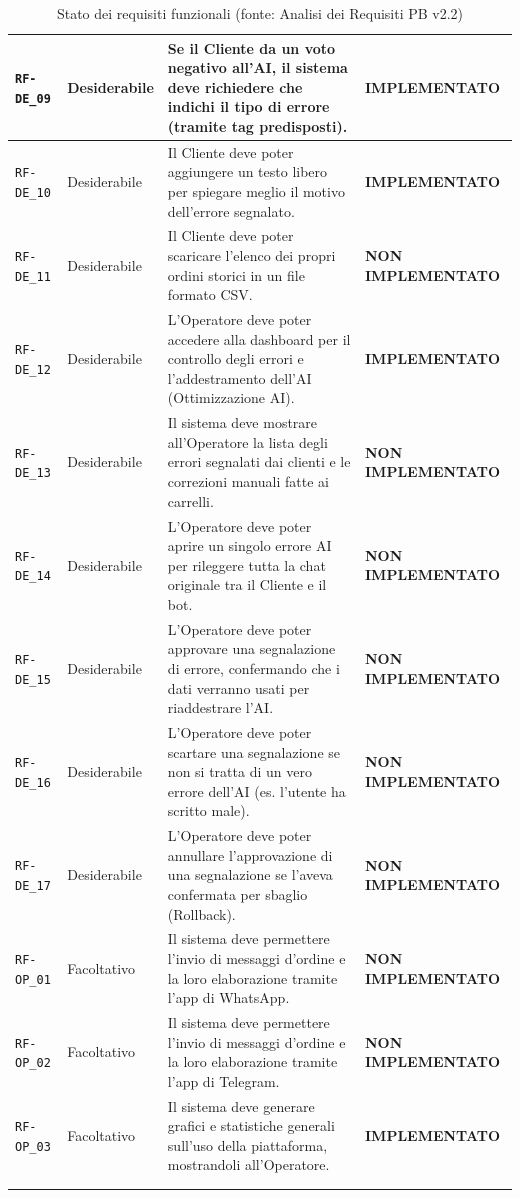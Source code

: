 \documentclass[a4paper, 11pt, oneside]{scrartcl}
\begin{document}
\begin{longtable}{|>{\raggedright\arraybackslash}p{}|>{\raggedright\arraybackslash}p{}|>{\raggedright\arraybackslash}p{}|>{\raggedright\arraybackslash}p{}|}
    \hline
    \texttt{RF-DE\_09} & Desiderabile & Se il Cliente da un voto negativo all'AI, il sistema deve richiedere che indichi il tipo di errore (tramite tag predisposti). & \textbf{IMPLEMENTATO} \\
    \hline
    \texttt{RF-DE\_10} & Desiderabile & Il Cliente deve poter aggiungere un testo libero per spiegare meglio il motivo dell'errore segnalato. & \textbf{IMPLEMENTATO} \\
    \hline
    \texttt{RF-DE\_11} & Desiderabile & Il Cliente deve poter scaricare l'elenco dei propri ordini storici in un file formato CSV. & \textbf{NON IMPLEMENTATO} \\
    \hline
    \texttt{RF-DE\_12} & Desiderabile & L'Operatore deve poter accedere alla dashboard per il controllo degli errori e l'addestramento dell'AI (Ottimizzazione AI). & \textbf{IMPLEMENTATO} \\
    \hline
    \texttt{RF-DE\_13} & Desiderabile & Il sistema deve mostrare all'Operatore la lista degli errori segnalati dai clienti e le correzioni manuali fatte ai carrelli. & \textbf{NON IMPLEMENTATO} \\
    \hline
    \texttt{RF-DE\_14} & Desiderabile & L'Operatore deve poter aprire un singolo errore AI per rileggere tutta la chat originale tra il Cliente e il bot. & \textbf{NON IMPLEMENTATO} \\
    \hline
    \texttt{RF-DE\_15} & Desiderabile & L'Operatore deve poter approvare una segnalazione di errore, confermando che i dati verranno usati per riaddestrare l'AI. & \textbf{NON IMPLEMENTATO} \\
    \hline
    \texttt{RF-DE\_16} & Desiderabile & L'Operatore deve poter scartare una segnalazione se non si tratta di un vero errore dell'AI (es. l'utente ha scritto male). & \textbf{NON IMPLEMENTATO} \\
    \hline
    \texttt{RF-DE\_17} & Desiderabile & L'Operatore deve poter annullare l'approvazione di una segnalazione se l'aveva confermata per sbaglio (Rollback). & \textbf{NON IMPLEMENTATO} \\
    \hline
    \texttt{RF-OP\_01} & Facoltativo & Il sistema deve permettere l'invio di messaggi d'ordine e la loro elaborazione tramite l'app di WhatsApp. & \textbf{NON IMPLEMENTATO} \\
    \hline
    \texttt{RF-OP\_02} & Facoltativo & Il sistema deve permettere l'invio di messaggi d'ordine e la loro elaborazione tramite l'app di Telegram. & \textbf{NON IMPLEMENTATO} \\
    \hline
    \texttt{RF-OP\_03} & Facoltativo & Il sistema deve generare grafici e statistiche generali sull'uso della piattaforma, mostrandoli all'Operatore. & \textbf{IMPLEMENTATO} \\
    \hline
    \multicolumn{4}{c}{} \\
    \caption{Stato dei requisiti funzionali (fonte: Analisi dei Requisiti PB v2.2)}\label{tab:stato_requisiti_funzionali}
\end{longtable}
\end{document}
